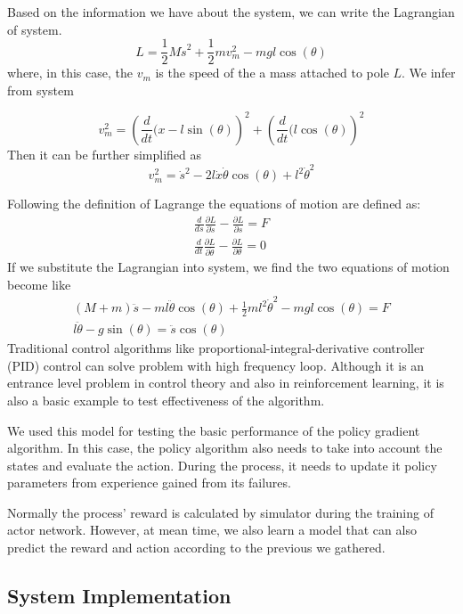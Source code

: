 \documentclass[officiallayout]{tktla}
\begin{document}
Based on the information we have about the system, we can write the Lagrangian of system. 
\begin{equation}
L = \frac{1}{2} M \dot{s}^2 + \frac{1}{2} m v_m^2 - mgl\cos(\theta)
\end{equation}
where, in this case, the $v_m$ is the speed of the a mass attached to pole $L$.
We infer from system 

\begin{equation}
v_m^2=\left(	\frac{d}{dt}(x - l\sin(\theta) \right)^2 + \left(\frac{d}{dt}(l\cos(\theta)\right)^2
\end{equation}
Then it can be further simplified as 	
\begin{equation}
v_m^2=\dot{s}^2-2l\dot{x}\dot{\theta} \cos(\theta) + l^2\dot{\theta}^2
\end{equation}

Following the definition of Lagrange the equations of motion are defined as:
\begin{align}
\frac{d}{ds}\frac{\partial L}{\partial \dot{s}} - \frac{\partial L}{\partial s} = F \\
\frac{d}{dt}\frac{\partial L}{\partial \dot{\theta}} - \frac{\partial L}{\partial \theta} = 0
\end{align}
If we substitute the Lagrangian into system, we find the two equations of motion become like 
\begin{align}
(M + m)\ddot{s} - 	ml\ddot{\theta} \cos(\theta) + \frac{1}{2}ml^2\dot{\theta}^2 - mgl\cos(\theta) = F \\
l\ddot{\theta} - g\sin(\theta) = \ddot{s} \cos(\theta)
\end{align}
Traditional control algorithms like proportional-integral-derivative controller (PID) control can solve problem with high frequency loop. Although it is an entrance level problem in control theory and also in reinforcement learning, it is also a basic example to test effectiveness of the algorithm.

We used this model for testing the basic performance of the policy gradient algorithm. In this case, the policy algorithm also needs to take into account the states and evaluate the action. During the process, it needs to update it policy parameters from experience gained from its failures.

Normally the process' reward is calculated by simulator during the training of actor network. However, at mean time, we also learn a model that can also predict the reward and action according to the previous we gathered.
\subsection{System Implementation}
\end{document}
